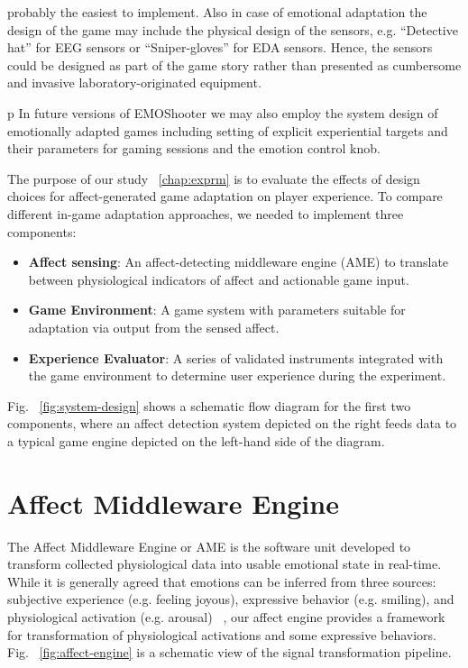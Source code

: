 probably the easiest to implement. Also in case of emotional adaptation the design of the game may include the physical design of the sensors, e.g. “Detective hat” for EEG sensors or “Sniper-gloves” for EDA sensors. Hence, the sensors could be designed as part of the game story rather than presented as cumbersome and invasive laboratory-originated equipment.

p In future versions of EMOShooter we may also employ the system design of emotionally adapted games including setting of explicit experiential targets and their parameters for gaming sessions and the emotion control knob.

The purpose of our study ~\ref{chap:exprm} is to evaluate the effects of design choices for affect-generated game adaptation on player experience. To compare different in-game adaptation approaches, we needed to implement three components:

\begin{itemize}
\item \textbf{Affect sensing}: An affect-detecting middleware engine (AME) to translate between physiological indicators of affect and actionable game input.
\item \textbf{Game Environment}: A game system with parameters suitable for adaptation via output from the sensed affect.
\item \textbf{Experience Evaluator}: A series of validated instruments integrated with the game environment to determine user experience during the experiment.
\end{itemize}

Fig. ~\ref{fig:system-design} shows a schematic flow diagram for the first two components, where an affect detection system depicted on the right feeds data to a typical game engine depicted on the left-hand side of the diagram.

\section{Affect Middleware Engine}

The Affect Middleware Engine or AME is the software unit developed to transform collected physiological data into usable emotional state in real-time. While it is generally agreed that emotions can be inferred from three sources: subjective experience (e.g. feeling joyous), expressive behavior (e.g. smiling), and physiological activation (e.g. arousal) ~\cite{scherer1993neuroscience}, our affect engine provides a framework for transformation of physiological activations and some expressive behaviors. Fig. ~\ref{fig:affect-engine} is a schematic view of the signal transformation pipeline.

